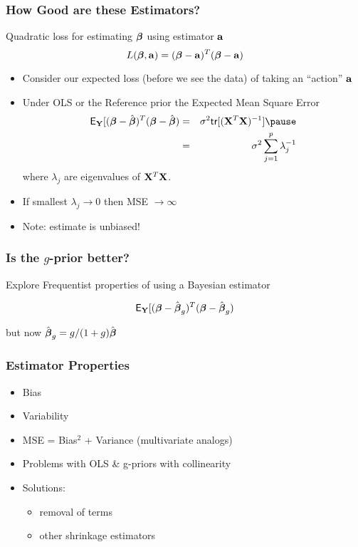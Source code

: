 \documentclass[handout]{beamer}
\begin{document}
\begin{frame}
  \frametitle{How Good are these Estimators?}
Quadratic loss for estimating  $\boldsymbol{\beta}$ using estimator $\mathbf{a}$
$$ L(\boldsymbol{\beta}, \mathbf{a}) =  ( \boldsymbol{\beta} - \mathbf{a})^T(\boldsymbol{\beta} -\mathbf{a})$$ \pause

\begin{itemize}
\item Consider our expected loss (before we see the data) of taking an
``action'' $\mathbf{a}$ \pause
\item Under OLS or the  Reference prior the Expected Mean Square Error  \pause
  \begin{eqnarray*}
\E_\Y[( \b - \bhat)^T(\b -\bhat) & = &\sigma^2
  \tr[(\X^T\X)^{-1}] \pause \\
 & = & \sigma^2 \sum_{j=1}^p \lambda_j^{-1}
  \end{eqnarray*}
where $\lambda_j$ are eigenvalues of $\mathbf{X}^T\mathbf{X}$.
\pause
\item If smallest $\lambda_j \to 0$ then MSE  $\to \infty$
\item Note: estimate is unbiased! 
\end{itemize}
\end{frame}

\begin{frame}
  \frametitle{Is the $g$-prior better?}
  
Explore Frequentist properties of using a Bayesian estimator

$$\textsf{E}_{\mathbf{Y}}[( \boldsymbol{\beta} - \hat{\boldsymbol{\beta}}_g)^T(\boldsymbol{\beta} -\hat{\boldsymbol{\beta}}_g)$$

but now $\hat{\boldsymbol{\beta}}_g = g/(1+g) \hat{\boldsymbol{\beta}}$
\end{frame}

\begin{frame}\frametitle{Estimator Properties}

  \begin{itemize}
  \item  Bias  \pause
  \item  Variability \pause
  \item MSE = Bias$^2$ + Variance  (multivariate analogs) \pause
\item Problems with OLS \& g-priors with collinearity \pause
\item Solutions: \pause
  \begin{itemize}
  \item removal of terms \pause
   \item other shrinkage estimators
  \end{itemize}

  \end{itemize}
\end{frame}
\end{document}
